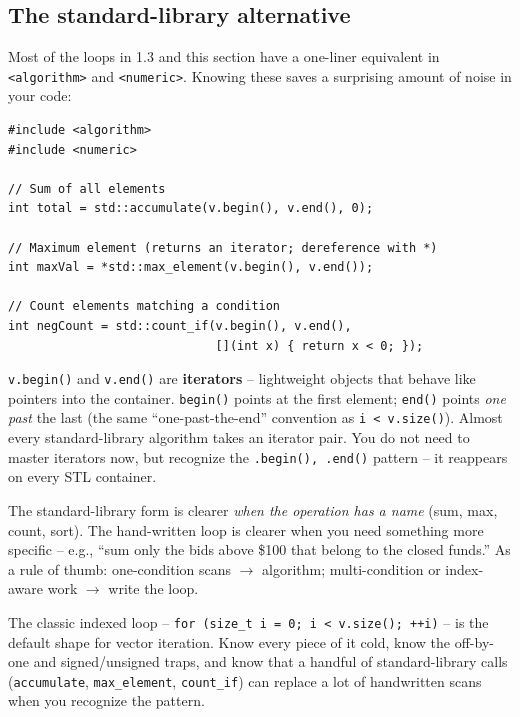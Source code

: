 \documentclass[11pt]{article}
\begin{document}
\subsection{The standard-library alternative}

Most of the loops in 1.3 and this section have a one-liner equivalent
in \texttt{<algorithm>} and \texttt{<numeric>}. Knowing these saves a
surprising amount of noise in your code:

\begin{lstlisting}
#include <algorithm>
#include <numeric>

// Sum of all elements
int total = std::accumulate(v.begin(), v.end(), 0);

// Maximum element (returns an iterator; dereference with *)
int maxVal = *std::max_element(v.begin(), v.end());

// Count elements matching a condition
int negCount = std::count_if(v.begin(), v.end(),
                             [](int x) { return x < 0; });
\end{lstlisting}

\begin{ideabox}
\texttt{v.begin()} and \texttt{v.end()} are \textbf{iterators} --
lightweight objects that behave like pointers into the container.
\texttt{begin()} points at the first element; \texttt{end()} points
\emph{one past} the last (the same ``one-past-the-end'' convention as
\texttt{i < v.size()}). Almost every standard-library algorithm
takes an iterator pair. You do not need to master iterators now, but
recognize the \texttt{.begin(), .end()} pattern -- it reappears on
every STL container.
\end{ideabox}

\begin{notebox}
The standard-library form is clearer \emph{when the operation has a
name} (sum, max, count, sort). The hand-written loop is clearer when
you need something more specific -- e.g., ``sum only the bids above
\$100 that belong to the closed funds.'' As a rule of thumb:
one-condition scans $\rightarrow$ algorithm; multi-condition or
index-aware work $\rightarrow$ write the loop.
\end{notebox}

\begin{ideabox}
The classic indexed loop -- \texttt{for (size\_t i = 0; i < v.size();
++i)} -- is the default shape for vector iteration. Know every piece
of it cold, know the off-by-one and signed/unsigned traps, and know
that a handful of standard-library calls
(\texttt{accumulate}, \texttt{max\_element}, \texttt{count\_if}) can
replace a lot of handwritten scans when you recognize the pattern.
\end{ideabox}
\end{document}
